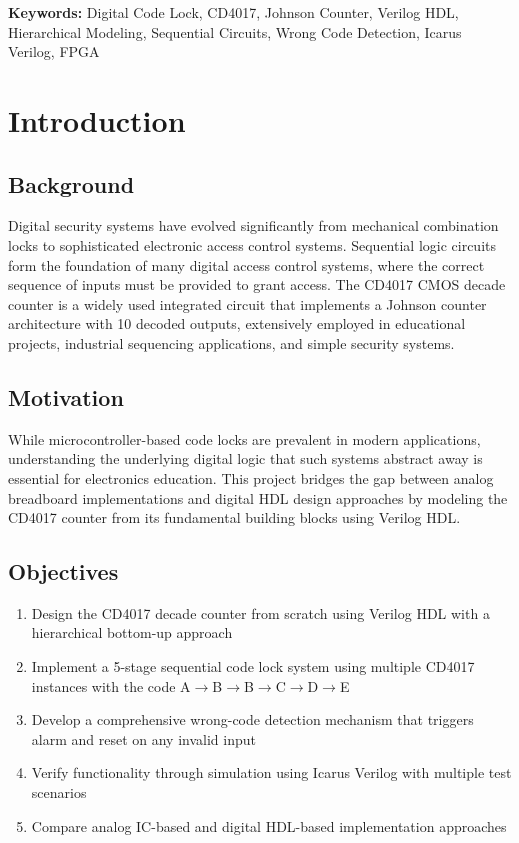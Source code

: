 \documentclass[12pt,a4paper]{report}
\begin{document}
\textbf{Keywords:} Digital Code Lock, CD4017, Johnson Counter, Verilog HDL, Hierarchical Modeling, Sequential Circuits, Wrong Code Detection, Icarus Verilog, FPGA

\chapter{Introduction}

\section{Background}

Digital security systems have evolved significantly from mechanical combination locks to sophisticated electronic access control systems. Sequential logic circuits form the foundation of many digital access control systems, where the correct sequence of inputs must be provided to grant access. The CD4017 CMOS decade counter is a widely used integrated circuit that implements a Johnson counter architecture with 10 decoded outputs, extensively employed in educational projects, industrial sequencing applications, and simple security systems.

\section{Motivation}

While microcontroller-based code locks are prevalent in modern applications, understanding the underlying digital logic that such systems abstract away is essential for electronics education. This project bridges the gap between analog breadboard implementations and digital HDL design approaches by modeling the CD4017 counter from its fundamental building blocks using Verilog HDL.

\section{Objectives}

\begin{enumerate}
    \item Design the CD4017 decade counter from scratch using Verilog HDL with a hierarchical bottom-up approach
    \item Implement a 5-stage sequential code lock system using multiple CD4017 instances with the code A$\rightarrow$B$\rightarrow$B$\rightarrow$C$\rightarrow$D$\rightarrow$E
    \item Develop a comprehensive wrong-code detection mechanism that triggers alarm and reset on any invalid input
    \item Verify functionality through simulation using Icarus Verilog with multiple test scenarios
    \item Compare analog IC-based and digital HDL-based implementation approaches
\end{enumerate}
\end{document}
